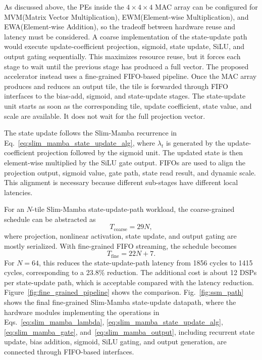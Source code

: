 \documentclass[lettersize,journal]{IEEEtran}
\begin{document}
As discussed above, the PEs inside the $4\times4\times4$ MAC array can be configured
for MVM(Matrix Vector Multiplication), EWM(Element-wise Multiplication), and EWA(Element-wise Addition), so the tradeoff between hardware reuse and latency must be considered.
A coarse implementation of the state-update path would execute update-coefficient projection,
sigmoid, state update, SiLU, and output gating sequentially. This maximizes
resource reuse, but it forces each stage to wait until the previous stage has
produced a full vector. The proposed accelerator instead uses a fine-grained
FIFO-based pipeline. Once the MAC array produces and reduces an output tile,
the tile is forwarded through FIFO interfaces to the bias-add, sigmoid, and
state-update stages. The state-update unit starts as soon as the corresponding
tile, update coefficient, state value, and scale are available. It does not wait
for the full projection vector.

The state update follows the Slim-Mamba recurrence
in
Eq.~\eqref{eq:slim_mamba_state_update_alg}, where $\lambda_t$ is generated by the
update-coefficient projection followed by the sigmoid unit. The updated state is then
element-wise multiplied by the SiLU gate output. FIFOs are
used to align the projection output, sigmoid value, gate path, state read result,
and dynamic scale. This alignment is necessary because different sub-stages have
different local latencies.

For an $N$-tile Slim-Mamba state-update-path workload, the coarse-grained schedule can be abstracted as
\begin{equation}
T_{\mathrm{coarse}} = 29N ,
\label{eq:coarse_latency}
\end{equation}
where projection, nonlinear activation, state update, and output gating are
mostly serialized. With fine-grained FIFO streaming, the schedule becomes
\begin{equation}
T_{\mathrm{fine}} = 22N + 7 .
\label{eq:fine_latency}
\end{equation}
For $N=64$, this reduces the state-update-path latency from 1856 cycles to 1415 cycles,
corresponding to a 23.8\% reduction. The additional cost is about 12 DSPs per
state-update path, which is acceptable compared with the latency reduction.
Figure~\ref{fig:fine_grained_pipeline} shows the comparison. Fig.~\ref{fig:ssm_path}
shows the final fine-grained Slim-Mamba state-update datapath, where the hardware modules implementing the operations in Eqs.~\eqref{eq:slim_mamba_lambda}, \eqref{eq:slim_mamba_state_update_alg}, \eqref{eq:slim_mamba_gate}, and~\eqref{eq:slim_mamba_output}, including recurrent state update, bias addition, sigmoid, SiLU gating, and output generation, are connected through FIFO-based interfaces.
\end{document}
